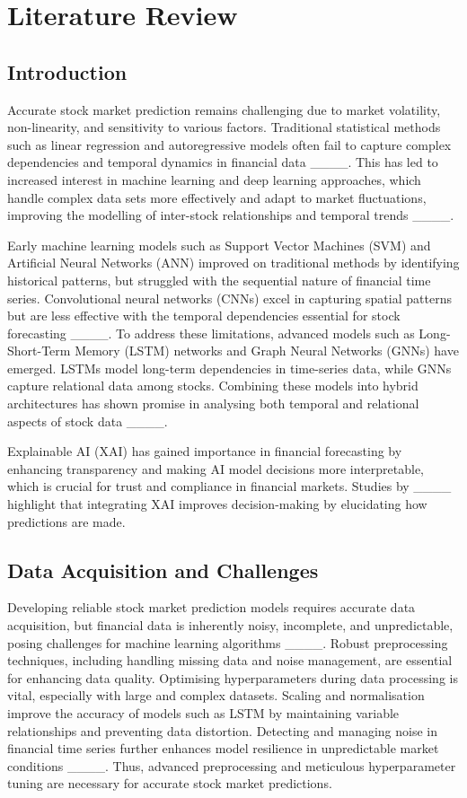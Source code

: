 \section{Literature Review}
\subsection{Introduction}

Accurate stock market prediction remains challenging due to market volatility, non-linearity, and sensitivity to various factors. Traditional statistical methods such as linear regression and autoregressive models often fail to capture complex dependencies and temporal dynamics in financial data ____. This has led to increased interest in machine learning and deep learning approaches, which handle complex data sets more effectively and adapt to market fluctuations, improving the modelling of inter-stock relationships and temporal trends ____.

Early machine learning models such as Support Vector Machines (SVM) and Artificial Neural Networks (ANN) improved on traditional methods by identifying historical patterns, but struggled with the sequential nature of financial time series. Convolutional neural networks (CNNs) excel in capturing spatial patterns but are less effective with the temporal dependencies essential for stock forecasting ____. To address these limitations, advanced models such as Long-Short-Term Memory (LSTM) networks and Graph Neural Networks (GNNs) have emerged. LSTMs model long-term dependencies in time-series data, while GNNs capture relational data among stocks. Combining these models into hybrid architectures has shown promise in analysing both temporal and relational aspects of stock data ____.

Explainable AI (XAI) has gained importance in financial forecasting by enhancing transparency and making AI model decisions more interpretable, which is crucial for trust and compliance in financial markets. Studies by ____ highlight that integrating XAI improves decision-making by elucidating how predictions are made.

\subsection{Data Acquisition and Challenges}

Developing reliable stock market prediction models requires accurate data acquisition, but financial data is inherently noisy, incomplete, and unpredictable, posing challenges for machine learning algorithms ____. Robust preprocessing techniques, including handling missing data and noise management, are essential for enhancing data quality. Optimising hyperparameters during data processing is vital, especially with large and complex datasets. Scaling and normalisation improve the accuracy of models such as LSTM by maintaining variable relationships and preventing data distortion. Detecting and managing noise in financial time series further enhances model resilience in unpredictable market conditions ____. Thus, advanced preprocessing and meticulous hyperparameter tuning are necessary for accurate stock market predictions.

